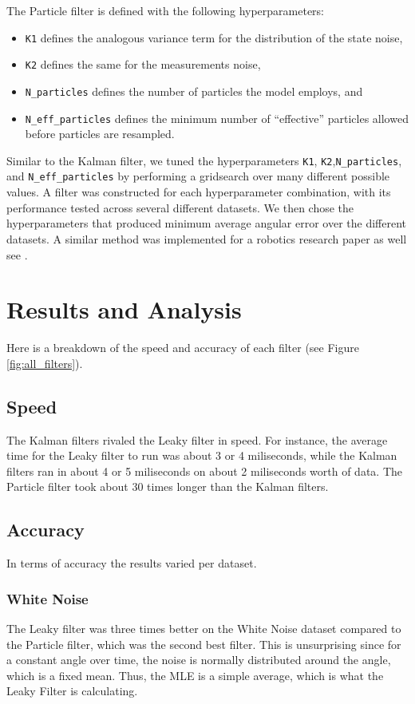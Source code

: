 \documentclass[11pt]{amsart}
\begin{document}
The Particle filter is defined with the following hyperparameters: 
\begin{itemize}
    \item \lstinline{K1} defines the analogous variance term for the distribution of the state noise,
    \item \lstinline{K2} defines the same for the measurements noise,
    \item \lstinline{N_particles} defines the number of particles the model employs, and
    \item \lstinline{N_eff_particles} defines the minimum number of “effective” particles allowed before particles are resampled.
\end{itemize}

Similar to the Kalman filter, we tuned the hyperparameters \lstinline{K1},
\lstinline{K2},\newline \lstinline{N_particles}, and \lstinline{N_eff_particles} by performing a
gridsearch over many different possible values. A filter was constructed for each hyperparameter
combination, with its performance tested across several different datasets. We then chose the
hyperparameters that produced minimum average angular error over the different datasets. A similar
method was implemented for a robotics research paper as well see \cite{Oops}.

\section{Results and Analysis}
Here is a breakdown of the speed and accuracy of each filter (see Figure \ref{fig:all_filters}).
\subsection{Speed}
The Kalman filters rivaled the Leaky filter in speed. For instance, the average time for the Leaky filter to run was about 3 or 4 miliseconds, while the Kalman filters ran in about 4 or 5 miliseconds on about 2 miliseconds worth of data. The Particle filter took about 30 times longer than the Kalman filters.
\subsection{Accuracy}
In terms of accuracy the results varied per dataset.
\subsubsection{White Noise}
The Leaky filter was three times better on the White Noise dataset compared to the Particle filter, which was the second best filter. This is unsurprising since for a constant angle over time, the noise is normally distributed around the angle, which is a fixed mean. Thus, the MLE is a simple average, which is what the Leaky Filter is calculating.
\end{document}
